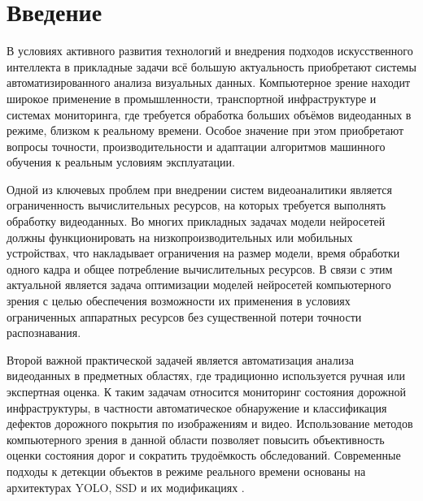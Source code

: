 \documentclass[a4paper,12pt]{article}
\begin{document}




\large

\onehalfspacing

\newpage

\tableofcontents

\newpage




\section*{Введение}

В условиях активного развития технологий и внедрения подходов искусственного интеллекта в прикладные задачи всё большую актуальность приобретают системы автоматизированного анализа визуальных данных. Компьютерное зрение находит широкое применение в промышленности, транспортной инфраструктуре и системах мониторинга, где требуется обработка больших объёмов видеоданных в режиме, близком к реальному времени. Особое значение при этом приобретают вопросы точности, производительности и адаптации алгоритмов машинного обучения к реальным условиям эксплуатации.

Одной из ключевых проблем при внедрении систем видеоаналитики является ограниченность вычислительных ресурсов, на которых требуется выполнять обработку видеоданных. Во многих прикладных задачах модели нейросетей должны функционировать на низкопроизводительных или мобильных устройствах, что накладывает ограничения на размер модели, время обработки одного кадра и общее потребление вычислительных ресурсов. В связи с этим актуальной является задача оптимизации моделей нейросетей компьютерного зрения с целью обеспечения возможности их применения в условиях ограниченных аппаратных ресурсов без существенной потери точности распознавания.

Второй важной практической задачей является автоматизация анализа видеоданных в предметных областях, где традиционно используется ручная или экспертная оценка. К таким задачам относится мониторинг состояния дорожной инфраструктуры, в частности автоматическое обнаружение и классификация дефектов дорожного покрытия по изображениям и видео. Использование методов компьютерного зрения в данной области позволяет повысить объективность оценки состояния дорог и сократить трудоёмкость обследований. Современные подходы к детекции объектов в режиме реального времени основаны на архитектурах YOLO, SSD и их модификациях \cite{redmon, liu}.
\end{document}
